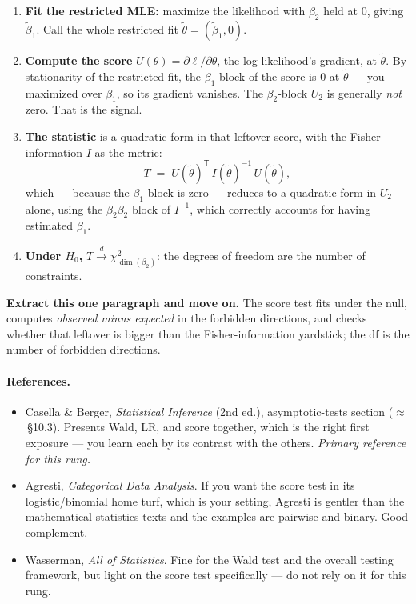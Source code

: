 \documentclass[11pt,a4paper]{article}
\newcommand{\Tr}{{\mathsf T}}
\theoremstyle{definition}
\begin{document}
\begin{enumerate}[leftmargin=1.6em,itemsep=0.45em]
\item \textbf{Fit the restricted MLE:} maximize the likelihood with $\beta_2$
  held at $0$, giving $\tilde\beta_1$. Call the whole restricted fit
  $\tilde\theta=(\tilde\beta_1,0)$.

\item \textbf{Compute the score} $U(\theta)=\partial\ell/\partial\theta$, the
  log-likelihood's gradient, at $\tilde\theta$. By stationarity of the restricted
  fit, the $\beta_1$-block of the score is $0$ at $\tilde\theta$ --- you
  maximized over $\beta_1$, so its gradient vanishes. The $\beta_2$-block $U_2$
  is generally \emph{not} zero. That is the signal.

\item \textbf{The statistic} is a quadratic form in that leftover score, with the
  Fisher information $I$ as the metric:
  \[
    T \;=\; U(\tilde\theta)^{\Tr}\,I(\tilde\theta)^{-1}\,U(\tilde\theta),
  \]
  which --- because the $\beta_1$-block is zero --- reduces to a quadratic form
  in $U_2$ alone, using the $\beta_2\beta_2$ block of $I^{-1}$, which correctly
  accounts for having estimated $\beta_1$.

\item \textbf{Under $H_0$,} $T \xrightarrow{\;d\;} \chi^2_{\dim(\beta_2)}$: the
  degrees of freedom are the number of constraints.
\end{enumerate}

\noindent\textbf{Extract this one paragraph and move on.} The score test fits
under the null, computes \emph{observed minus expected} in the forbidden
directions, and checks whether that leftover is bigger than the
Fisher-information yardstick; the df is the number of forbidden directions.

\paragraph{References.}
\begin{itemize}[leftmargin=1.4em,itemsep=0.3em]
\item Casella \& Berger, \emph{Statistical Inference} (2nd ed.), asymptotic-tests
  section ($\approx$\,\S10.3). Presents Wald, LR, and score together, which is
  the right first exposure --- you learn each by its contrast with the others.
  \emph{Primary reference for this rung.}
\item Agresti, \emph{Categorical Data Analysis}. If you want the score test in
  its logistic/binomial home turf, which is your setting, Agresti is gentler than
  the mathematical-statistics texts and the examples are pairwise and binary.
  Good complement.
\item Wasserman, \emph{All of Statistics}. Fine for the Wald test and the overall
  testing framework, but light on the score test specifically --- do not rely on
  it for this rung.
\end{itemize}
\end{document}
